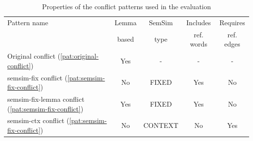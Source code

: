 \documentclass[11pt]{scrreprt}
\begin{document}
\begin{table}
\centering
\begin{tabular}{lcccc}
\toprule
\multicolumn{1}{l}{Pattern name}		& \multicolumn{1}{c}{Lemma}		& \multicolumn{1}{c}{SemSim}	& \multicolumn{1}{c}{Includes}		& \multicolumn{1}{c}{Requires} \\
\multicolumn{1}{l}{} 				& \multicolumn{1}{c}{based} 		& \multicolumn{1}{c}{type} 		& \multicolumn{1}{c}{ref. words} 	& \multicolumn{1}{c}{ref. edges} \\
\midrule
Original conflict (\cref{pat:original-conflict})					& Yes 		& - 		& -			& - \\
semsim-fix conflict (\cref{pat:semsim-fix-conflict})				& No		& FIXED		& Yes		& No \\
semsim-fix-lemma conflict (\cref{pat:semsim-fix-conflict}) 		& Yes 		& FIXED		& Yes		& No \\
semsim-ctx conflict (\cref{pat:semsim-fix-conflict})				& No		& CONTEXT	& No		& Yes \\
\bottomrule
\end{tabular}
\caption{Properties of the conflict patterns used in the evaluation}
\label{tab:evaluation-patterns}
\end{table}
\end{document}
